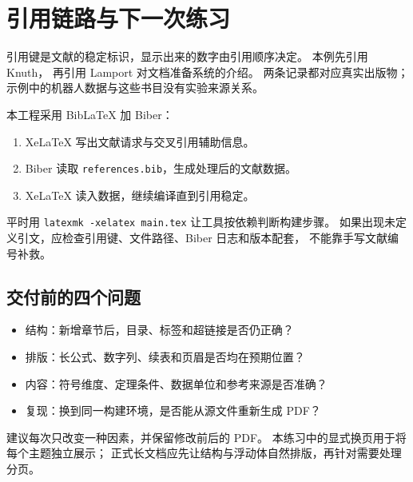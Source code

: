 \section{引用链路与下一次练习}\label{sec:references}
引用键是文献的稳定标识，显示出来的数字由引用顺序决定。
本例先引用 Knuth\cite{knuth1984texbook}，
再引用 Lamport 对文档准备系统的介绍\cite{lamport1994latex}。
两条记录都对应真实出版物；示例中的机器人数据与这些书目没有实验来源关系。

本工程采用 BibLaTeX 加 Biber：
\begin{enumerate}
  \item XeLaTeX 写出文献请求与交叉引用辅助信息。
  \item Biber 读取 \texttt{references.bib}，生成处理后的文献数据。
  \item XeLaTeX 读入数据，继续编译直到引用稳定。
\end{enumerate}
平时用 \texttt{latexmk -xelatex main.tex} 让工具按依赖判断构建步骤。
如果出现未定义引文，应检查引用键、文件路径、Biber 日志和版本配套，
不能靠手写文献编号补救。

\subsection*{交付前的四个问题}
\begin{itemize}
  \item 结构：新增章节后，目录、标签和超链接是否仍正确？
  \item 排版：长公式、数字列、续表和页眉是否均在预期位置？
  \item 内容：符号维度、定理条件、数据单位和参考来源是否准确？
  \item 复现：换到同一构建环境，是否能从源文件重新生成 PDF？
\end{itemize}

\printbibliography[heading=subbibliography,title={参考文献}]

\bigskip
\noindent
建议每次只改变一种因素，并保留修改前后的 PDF。
本练习中的显式换页用于将每个主题独立展示；
正式长文档应先让结构与浮动体自然排版，再针对需要处理分页。
